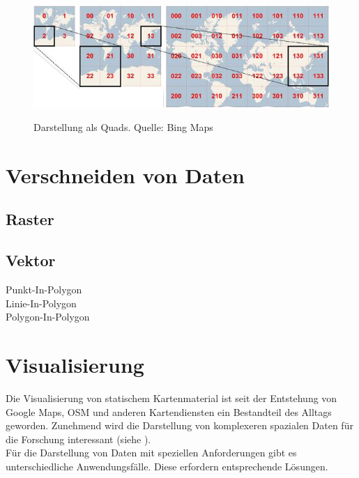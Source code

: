 \documentclass[10pt,conference,compsocconf]{IEEEtran}
\begin{document}
\begin{figure}[H]
  \centering
  	\includegraphics[width=\columnwidth]{img/bing_quads}\\
  \caption[]{Darstellung als Quads. Quelle: Bing Maps\cite{waldbiomasse}}
  \label{img:bing_quads}
\end{figure}


\section{Verschneiden von Daten}


\subsection{Raster}


\subsection{Vektor}
Punkt-In-Polygon\\

Linie-In-Polygon\\

Polygon-In-Polygon


\section{Visualisierung}
Die Visualisierung von statischem Kartenmaterial ist seit der Entstehung von Google Maps, OSM und anderen Kartendiensten ein Bestandteil des Alltags geworden. Zunehmend wird die Darstellung von komplexeren spazialen Daten für die Forschung interessant (siehe \cite{gps_collars} \cite{wms_flow_mapping}).\\
Für die Darstellung von Daten mit speziellen Anforderungen gibt es unterschiedliche Anwendungsfälle. Diese erfordern entsprechende Lösungen.
\end{document}
